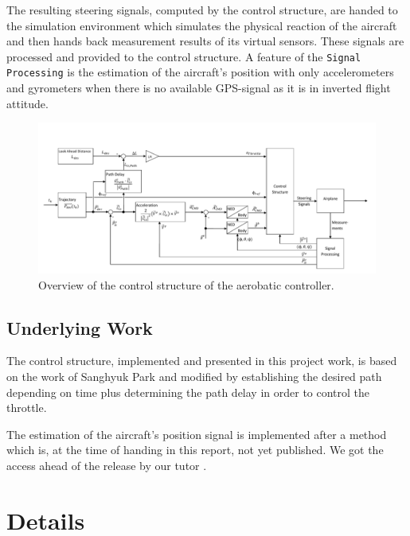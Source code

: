 \documentclass[11pt,a4paper]{scrartcl}		%
\begin{document}
The resulting steering signals, computed by the control structure, are handed to the simulation environment which simulates the physical reaction of the aircraft and then hands back measurement results of its virtual sensors.
These signals are processed and provided to the control structure. 
A feature of the \texttt{Signal Processing} is the estimation of the aircraft's position with only accelerometers and gyrometers when there is no available GPS-signal as it is in inverted flight attitude.

\begin{figure}[!h]
  \begin{center}
  	\includegraphics[width=18.8cm, angle=90]{pictures/complete_structure.pdf}
  \end{center}
  \caption{Overview of the control structure of the aerobatic controller.}
  \label{fig_complete_structure}
\end{figure}


\subsection{Underlying Work}

The control structure, implemented and presented in this project work, is based on the work of Sanghyuk Park\cite{Park.2012} and modified by establishing the desired path depending on time plus determining the path delay in order to control the throttle.

The estimation of the aircraft's position signal is implemented after a method which is, at the time of handing in this report, not yet published. We got the access ahead of the release by our tutor \cite{Dantsker.2016}.

\medskip





\section{Details}\label{ch_Details}
\end{document}
